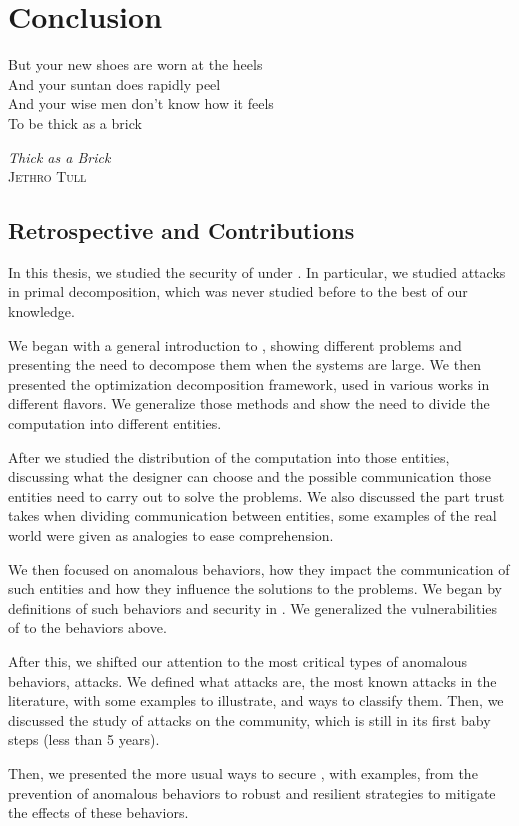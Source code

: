 \documentclass[../main.tex]{subfiles}
\begin{document}
\chapter{Conclusion}\label{sec:conclusion}
\epigraph{\centering But your new shoes are worn at the heels\\ And your suntan does rapidly peel\\ And your wise men don't know how it feels\\ To be thick as a brick}
{\textit{Thick as a Brick}\\\textsc{Jethro Tull}}

\section{Retrospective and Contributions}
\label{sec:retr-contr}
In this thesis, we studied the security of \cps{} under \dmpc{}.
In particular, we studied attacks in primal decomposition, which was never studied before to the best of our knowledge.

We began with a general introduction to \mpc{}, showing different \mpc{} problems and presenting the need to decompose them when the systems are large.
We then presented the optimization decomposition framework, used in various works in different flavors.
We generalize those methods and show the need to divide the computation into different entities.

After we studied the distribution of the computation into those entities, discussing what the designer can choose and the possible communication those entities need to carry out to solve the problems.
We also discussed the part trust takes when dividing communication between entities, some examples of the real world were given as analogies to ease comprehension.

We then focused on anomalous behaviors, how they impact the communication of such entities and how they influence the solutions to the problems.
We began by definitions of such behaviors and security in \cps{}.
We generalized the vulnerabilities of \cps{} to the behaviors above.

After this, we shifted our attention to the most critical types of anomalous behaviors, attacks.
We defined what attacks are, the most known attacks in the literature, with some examples to illustrate, and ways to classify them.
Then, we discussed the study of attacks on the \dmpc{} community, which is still
in its first baby steps (less than 5 years).

Then, we presented the more usual ways to secure \cps{}, with examples, from the prevention of anomalous behaviors to robust and resilient strategies to mitigate the effects of these behaviors.
\end{document}
